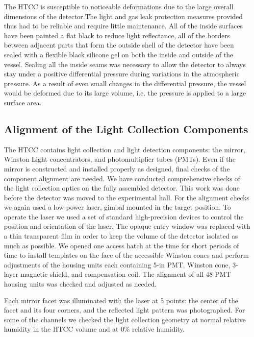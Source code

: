 The HTCC is susceptible to noticeable deformations due to the large overall dimensions of the detector.The light and gas leak protection measures provided thus had to be reliable and require little maintenance. All of the inside surfaces have been painted a flat black to reduce light reflectance, all of the borders between adjacent parts that form the outside shell of the detector have been sealed with a flexible black silicone gel on both the inside and outside of the vessel. Sealing all the inside seams was necessary to allow the detector to always stay under a positive differential pressure during variations in the atmospheric pressure. As a result of even small changes in the differential pressure, the vessel would be deformed due to its large volume, i.e. the pressure is applied to a large surface area. 

\subsection{Alignment of the Light Collection Components}
The HTCC contains light collection and light detection components: the mirror, Winston Light concentrators, and photomultiplier tubes (PMTs). Even if the mirror is constructed and installed properly as designed, final checks of the component alignment are needed. We have conducted comprehensive checks of the light collection optics on the fully assembled detector. This work was done before the detector was moved to the experimental hall. For the alignment checks we again used a low-power laser, gimbal mounted in the target position. To operate the laser we used a set of standard high-precision devices to control the position and orientation of the laser. The opaque entry window was replaced with a thin transparent film in order to keep the volume of the detector isolated as much as possible. We opened one access hatch at the time for short periods of time to install templates on the face of the accessible Winston cones and perform adjustments of the housing units each containing 5-in PMT, Winston cone, 3-layer magnetic shield, and compensation coil. The alignment of all 48 PMT housing units was checked and adjusted as needed.

Each mirror facet was illuminated with the laser at 5 points: the center of the facet and its four corners, and the reflected light  pattern was photographed. For some of the channels we checked the light collection geometry at normal relative humidity in the HTCC volume and at 0\% relative humidity. 


